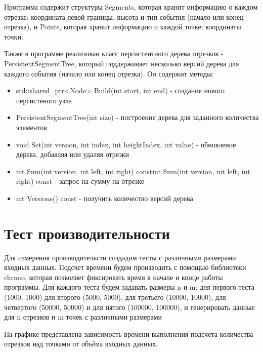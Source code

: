 \documentclass[12pt]{article}
\begin{document}
Программа содержит структуры Segments, которая хранит информацию о каждом отрезке: координата левой границы, высота и тип события (начало или конец отрезка), и Points, которая хранит информацию о каждой точке: координаты точки.

Также в программе реализован класс персистентного дерева отрезков - PersistentSegmentTree, который поддерживает несколько версий дерева  для каждого события (начало или конец отрезка). Он содержит методы:
\begin{itemize}
    \item std::shared\_ptr<Node> Build(int start, int end) - создание нового персистеного узла
    \item PersistentSegmentTree(int size) - построение дерева для заданного количества элементов
    \item void Set(int version, int index, int heightIndex, int value) - обновление дерева, добавляя или удаляя отрезки
    \item int Sum(int version, int left, int right) constint Sum(int version, int left, int right) const - запрос на сумму на отрезке
    \item int Versions() const - получить количество версий дерева
\end{itemize}

\newpage
\section*{Тест производительности}

Для измерения производительсти создадим тесты с различными размерами входных данных. Подсчет времени будем производить с помощью библиотеки chrono, которая позволяет фиксировать время в начале и конце работы программы. Для каждого теста будем задавать размеры n и m: для первого теста (1000, 1000) для второго (5000, 5000), для третьего (10000, 10000), для четвертого (50000, 50000) и для пятого (100000, 100000), и генерировать данные для n отрезков и m точек с различными размерами

На графике представлена зависимость времени выполнения подсчета количества отрезков над точками от объёма входных данных.
\end{document}
